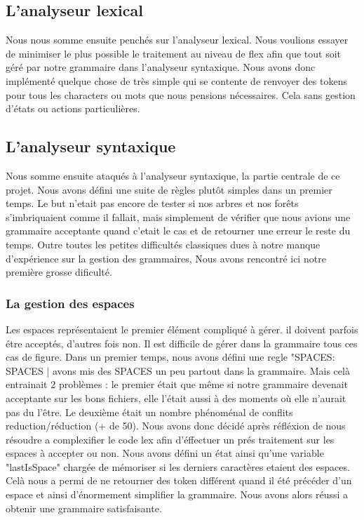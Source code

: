 \documentclass[12pt]{article}
\begin{document}
\subsection{L'analyseur lexical}

Nous nous somme ensuite penchés sur l'analyseur lexical. Nous voulions essayer de
minimiser le plus possible le traitement au niveau de flex afin que tout soit géré
par notre grammaire dans l'analyseur syntaxique. Nous avons donc implémenté
quelque chose de très simple qui se contente de renvoyer des tokens pour tous les
characters ou mots que nous pensions nécessaires. Cela sans gestion d'états ou actions
particulières.

\subsection{L'analyseur syntaxique}

Nous somme ensuite ataqués à l'analyseur syntaxique, la partie centrale de ce projet.
Nous avons défini une suite de règles plutôt simples dans un premier temps. Le but
n'etait pas encore de tester si nos arbres et nos forêts s'imbriquaient comme il fallait,
mais simplement de vérifier que nous avions une grammaire acceptante quand c'etait
le cas et de retourner une erreur le reste du temps.
\newline
Outre toutes les petites difficultés classiques dues à notre manque d'expérience
sur la gestion des grammaires, Nous avons rencontré ici notre première
grosse dificulté.

\subsubsection{La gestion des espaces}

Les espaces représentaient le premier élément compliqué à gérer. il doivent parfois étre acceptés,
d'autres fois non. Il est difficile de gérer dans la grammaire tous ces cas de figure.
Dans un premier temps, nous avons défini une regle "SPACES: SPACES | %
avons mis des SPACES un peu partout dans la grammaire. Mais celà entrainait 2 problèmes :
le premier était que même si notre grammaire devenait acceptante sur les bons fichiers,
elle l'était aussi à des moments où elle n'aurait pas du l'être. Le deuxième était un
nombre phénoménal de conflits reduction/réduction (+ de 50).
\newline
Nous avons donc décidé après réfléxion de nous résoudre a complexifier le code lex
afin d'éffectuer un prés traitement sur les espaces à accepter ou non.
Nous avons défini un état ainsi qu'une variable "lastIsSpace" chargée de mémoriser
si les derniers caractères etaient des espaces. Celà nous a permi de ne retourner des token
différent quand il été précéder d'un espace et ainsi d'énormement simplifier la grammaire.
Nous avons alors réussi a obtenir une grammaire satisfaisante.
\end{document}
